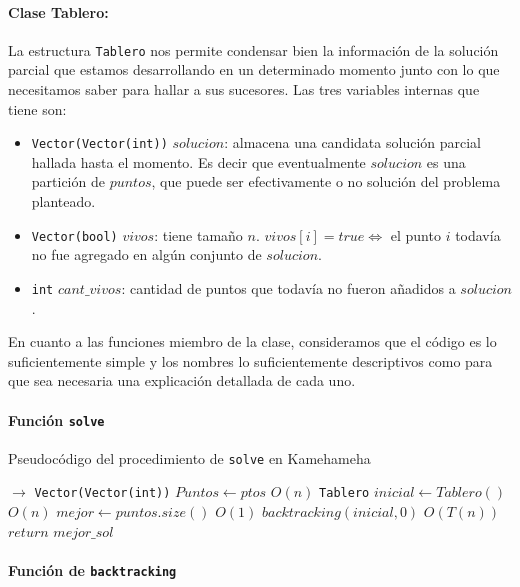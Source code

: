   \paragraph{Clase Tablero:} La estructura \texttt{Tablero} nos permite condensar bien la información de la solución parcial que estamos desarrollando en un determinado momento junto con lo que necesitamos saber para hallar a sus sucesores. Las tres variables internas que tiene son:
  \begin{itemize}
    \item \texttt{Vector(Vector(int))} $solucion$: almacena una candidata solución parcial hallada hasta el momento. Es decir que eventualmente $solucion$ es una partición de $puntos$, que puede ser efectivamente o no solución del problema planteado.
    \item \texttt{Vector(bool)} $vivos$: tiene tamaño $n$. $vivos[i] = true \Leftrightarrow$ el punto $i$ todavía no fue agregado en algún conjunto de $solucion$.
    \item \texttt{int} $cant\_vivos$: cantidad de puntos que todavía no fueron añadidos a $solucion$.
  \end{itemize}

  En cuanto a las funciones miembro de la clase, consideramos que el código es lo suficientemente simple y los nombres lo suficientemente descriptivos como para que sea necesaria una explicación detallada de cada uno.

  \paragraph{Función \texttt{solve}}

  \begin{algorithm}[H]
  \begin{algorithmic}
  \caption{Pseudocódigo del procedimiento de \texttt{solve} en Kamehameha}
    $\rightarrow$ \texttt{Vector(Vector(int))}
      \State $Puntos\gets ptos$
      \Comment $O(n)$
      \State \texttt{Tablero} $inicial \gets Tablero()$
      \Comment $O(n)$
      \State $mejor \gets puntos.size()$
      \Comment $O(1)$
      \State $backtracking(inicial,0)$
      \Comment $O(T(n))$
      \State $return$ $mejor\_sol$
    \EndProcedure
  \end{algorithmic}
  \end{algorithm}

  \paragraph{Función de \texttt{backtracking}}
  
